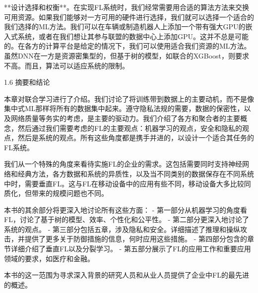 **设计选择和权衡**。在实现FL系统时，我们经常需要用合适的算法方法来交换可用资源。如果我们能够对一方可用的硬件进行选择，我们就可以选择一个适合的我们选择的ML方法。我们可以在车辆或制造机器人上添加一个带有强大GPU的嵌入式系统，或者在我们想让其参与联盟的数据中心上添加GPU。这并不总是可能的。在各方的计算平台是给定的情况下，我们可以使用适合我们资源的ML方法。虽然DNN在一方是资源密集型的，但基于树的模型，如联合的XGBoost，则要求不高。而且，算法可以适应系统的限制。

1.6 摘要和结论

本章对联合学习进行了介绍。我们讨论了将训练带到数据上的主要动机，而不是像集中式ML那样将所有的数据集中起来。遵守隐私法规的需要，数据的保密性，以及网络质量等务实的考虑，是主要的驱动力。我们介绍了各方和聚合者的主要概念，然后通过我们需要考虑的FL的主要观点：机器学习的观点，安全和隐私的观点，然后是系统的观点。所有这些角度都是携手并进的，以设计一个适合其任务的FL系统。

我们从一个特殊的角度来看待实施FL的企业的需求。这包括需要同时支持神经网络和经典方法，各方数据和系统的异质性，以及当不同类别的数据保存在不同系统中时，需要垂直FL。这与FL在移动设备中的应用有些不同，移动设备大多比较同质化，但带来的规模问题也不同。

本书的其余部分将更深入地讨论所有这些方面：
- 第一部分从机器学习的角度看FL，讨论了基于树的模型、效率、个性化和公平性。
- 第二部分更深入地讨论了系统的观点。
- 第三部分包括五章，涉及隐私和安全。详细描述了推理和操纵攻击，并提供了更多关于防御措施的信息，何时应用这些措施。
- 第四部分包含的章节详细介绍了垂直FL以及分裂学习。
- 第五部分展示了FL的应用工作和重要应用领域的要求，如医疗和金融。

本书的这一范围为寻求深入背景的研究人员和从业人员提供了企业中FL的最先进的概述。

%
%